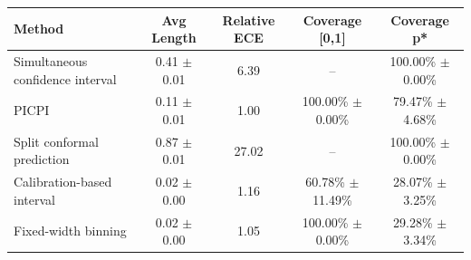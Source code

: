 \scriptsize
\begin{tabular}{lcccc}

\toprule
Method & Avg Length & Relative ECE & Coverage [0,1] & Coverage p* \\
\midrule
Simultaneous confidence interval & 0.41 $\pm$ 0.01 & 6.39 & -- & 100.00\% $\pm$ 0.00\% \\
PICPI & 0.11 $\pm$ 0.01 & 1.00 & 100.00\% $\pm$ 0.00\% & 79.47\% $\pm$ 4.68\% \\
Split conformal prediction & 0.87 $\pm$ 0.01 & 27.02 & -- & 100.00\% $\pm$ 0.00\% \\
Calibration-based interval & 0.02 $\pm$ 0.00 & 1.16 & 60.78\% $\pm$ 11.49\% & 28.07\% $\pm$ 3.25\% \\
Fixed-width binning & 0.02 $\pm$ 0.00 & 1.05 & 100.00\% $\pm$ 0.00\% & 29.28\% $\pm$ 3.34\% \\
\bottomrule

\end{tabular}
